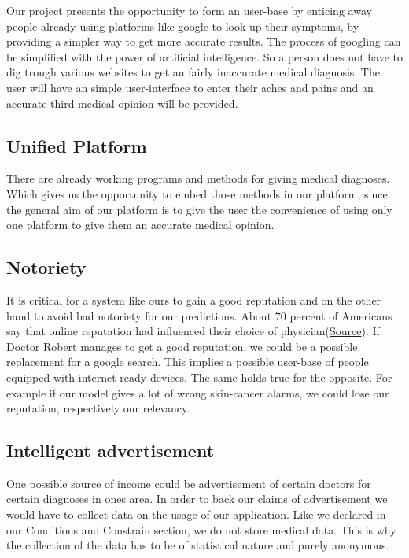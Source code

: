 \documentclass[12pt]{article}
\theoremstyle{definition}
\begin{document}
Our project presents the opportunity to form an user-base by enticing away people already using platforms like google to look up their symptoms, by providing a simpler way to get more accurate results. The process of googling can be simplified with the power of artificial intelligence. So a person does not have to dig trough various websites to get an fairly inaccurate medical diagnosis. The user will have an simple user-interface to enter their aches and pains and an accurate third medical opinion will be provided. 

\subsection{Unified Platform}

There are already working programs and methods for giving medical diagnoses. Which gives us the opportunity to embed those methods in our platform, since the general aim of our platform is to give the user the convenience of using only one platform to give them an accurate medical opinion.

\subsection{Notoriety}

It is critical for a system like ours to gain a good reputation and on the other hand to avoid bad notoriety for our predictions. About 70 percent of Americans say that online reputation had influenced their choice of physician(\href{https://www.mobihealthnews.com/content/95-americans-find-online-doctor-reviews-reliable-survey-suggests}{Source}). If Doctor Robert manages to get a good reputation, we could be a possible replacement for a google search. This implies a possible user-base of people equipped with internet-ready devices. The same holds true for the opposite. For example if our model gives a lot of wrong skin-cancer alarms, we could lose our reputation, respectively our relevancy.

\subsection{Intelligent advertisement}

One possible source of income could be advertisement of certain doctors for certain diagnoses in ones area. In order to back our claims of advertisement we would have to collect data on the usage of our application.
Like we declared in our Conditions and Constrain section, we do not store medical data. This is why the collection of the data has to be of statistical nature and purely anonymous.
\end{document}
